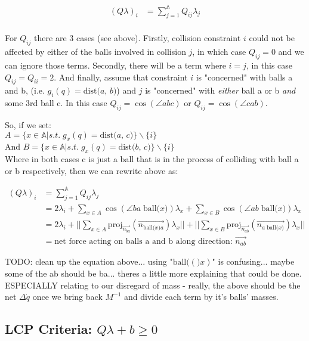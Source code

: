 \documentclass[12pt]{article}
\newcommand{\bigA}{{\mathbb{A}}}
\newcommand{\dist}[2]{\text{dist(} #1 \text{, } #2 \text{)}}
\newcommand{\ball}[1]{\text{ball(} #1 \text{)}}
\newcommand{\proj}[2]{\text{proj}_{#1}(#2)}
\begin{document}
\begin{align*}
(Q \lambda)_i 
    &= \sum_{j = 1}^{\bigA} Q_{ij} \lambda_j\\
\end{align*}

For $Q_{ij}$ there are 3 cases (see above). Firstly, collision constraint $i$ could
not be affected by either of the balls involved in collision $j$, in which case $Q_{ij} = 0$
and we can ignore those terms. Secondly, there will be a term where $i = j$, in this case
$Q_{ij} = Q_{ii} = 2$. And finally, assume that constraint $i$ is "concerned" with balls a and b,
(i.e. $g_i(q) = \dist{a}{b}$) and $j$ is "concerned" with \textit{either}
ball a or b \textit{and} some 3rd ball c. In this case
$Q_{ij} = \cos(\angle abc)$ or $Q_{ij} = \cos(\angle cab)$.

So, if we set:\\
$A = \{x \in \bigA | s.t. \; g_x(q) = \dist{a}{c}\} \backslash \{i\}$ \\
And $B = \{x \in \bigA | s.t. \; g_x(q) = \dist{b}{c}\} \backslash \{i\}$  \\
Where in both cases c is just a ball that is in the process of colliding with ball a or b respectively, then
we can rewrite above as:

\begin{align*}
(Q \lambda)_i 
    &= \sum_{j = 1}^{\bigA} Q_{ij} \lambda_j\\
    &= 2\lambda_i + \sum_{x \in A}^{} \cos(\angle ba\;\ball{x})\lambda_x + \sum_{x \in B}^{} \cos(\angle ab\;\ball{x})\lambda_x\\
    &= 2\lambda_i
        + ||\sum_{x \in A}^{}\proj{\overrightarrow{n_{ba}}}{\overrightarrow{n_{\ball{x}a}}} \lambda_x||
        + ||\sum_{x \in B}^{}\proj{\overrightarrow{n_{ab}}}{\overrightarrow{n_{a\;\ball{x}}}} \lambda_x||\\
    &= \text{net force acting on balls a and b along direction: } \overrightarrow{n_{ab}}
\end{align*}


TODO: clean up the equation above... using "$\ball(x)$" is confusing... maybe some of the ab should be ba...
theres a little more explaining that could be done. ESPECIALLY relating to our disregard of mass - 
really, the above should be the net $\Delta \dot{q}$ once we bring back $M^{-1}$ and divide each
term by it's balls' masses.

\subsection*{LCP Criteria: $Q\lambda + b \geq 0$}
\end{document}
